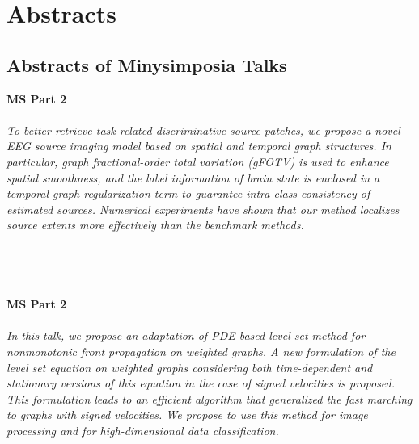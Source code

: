 
\part{Abstracts}

\chapter*{Abstracts of Minysimposia Talks}

\begin{multicols}{2}

    \noindent\textbf{MS Part 2}\\
\\  
    \textit{To better retrieve task related discriminative source patches, we propose a novel EEG source imaging model based on spatial and temporal graph structures. In particular, graph fractional-order total variation (gFOTV) is used to enhance spatial smoothness, and the label information of brain state is enclosed in a temporal graph regularization term to guarantee intra-class consistency of estimated sources. Numerical experiments have shown that our method localizes source extents more effectively than the benchmark methods.}\\
\\ 
    \\
    \\\\
    \noindent\textbf{MS Part 2}\\
\\  
    \textit{In this talk, we propose an adaptation of  PDE-based level set method for nonmonotonic front propagation on weighted graphs.
A new formulation of the level set equation on weighted graphs considering both time-dependent and stationary versions of this equation in the case of signed velocities is proposed. This formulation leads to an efficient algorithm that generalized the fast marching to graphs with signed velocities. We propose to use this method for image processing and for high-dimensional data classification.}\\
\\ 
    \\
    \\\\

\end{multicols}
